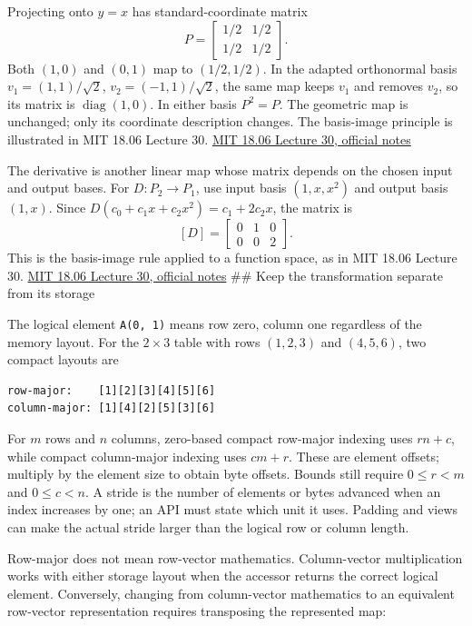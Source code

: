 Projecting onto \(y=x\) has standard-coordinate matrix \[
P=\begin{bmatrix}1/2&1/2\\1/2&1/2\end{bmatrix}.
\] Both \((1,0)\) and \((0,1)\) map to \((1/2,1/2)\). In the adapted orthonormal basis \(v_1=(1,1)/\sqrt2\), \(v_2=(-1,1)/\sqrt2\), the same map keeps \(v_1\) and removes \(v_2\), so its matrix is \(\operatorname{diag}(1,0)\). In either basis \(P^2=P\). The geometric map is unchanged; only its coordinate description changes. The basis-image principle is illustrated in MIT 18.06 Lecture 30. \href{https://ocw.mit.edu/courses/18-06-linear-algebra-spring-2010/71bffaffa75c005516ee010daf17868b_MIT18_06S10_L30.pdf}{MIT 18.06 Lecture 30, official notes}

The derivative is another linear map whose matrix depends on the chosen input and output bases. For \(D:P_2\to P_1\), use input basis \((1,x,x^2)\) and output basis \((1,x)\). Since \(D(c_0+c_1x+c_2x^2)=c_1+2c_2x\), the matrix is \[
[D]=\begin{bmatrix}0&1&0\\0&0&2\end{bmatrix}.
\] This is the basis-image rule applied to a function space, as in MIT 18.06 Lecture 30. \href{https://ocw.mit.edu/courses/18-06-linear-algebra-spring-2010/71bffaffa75c005516ee010daf17868b_MIT18_06S10_L30.pdf}{MIT 18.06 Lecture 30, official notes} \#\# Keep the transformation separate from its storage

The logical element \texttt{A(0,\ 1)} means row zero, column one regardless of the memory layout. For the \(2\times3\) table with rows \((1,2,3)\) and \((4,5,6)\), two compact layouts are

\begin{verbatim}
row-major:    [1][2][3][4][5][6]
column-major: [1][4][2][5][3][6]
\end{verbatim}

For \(m\) rows and \(n\) columns, zero-based compact row-major indexing uses \(rn+c\), while compact column-major indexing uses \(cm+r\). These are element offsets; multiply by the element size to obtain byte offsets. Bounds still require \(0\le r<m\) and \(0\le c<n\). A stride is the number of elements or bytes advanced when an index increases by one; an API must state which unit it uses. Padding and views can make the actual stride larger than the logical row or column length.

Row-major does not mean row-vector mathematics. Column-vector multiplication works with either storage layout when the accessor returns the correct logical element. Conversely, changing from column-vector mathematics to an equivalent row-vector representation requires transposing the represented map:

